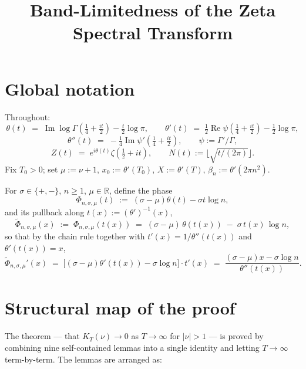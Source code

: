 \documentclass[11pt]{article}
\title{Band-Limitedness of the Zeta Spectral Transform}
\author{}
\date{}
\DeclareMathOperator{\ImOp}{Im}
\DeclareMathOperator{\ReOp}{Re}
\let\Im\ImOp
\let\Re\ReOp
\begin{document}
\maketitle

\section*{Global notation}

Throughout:
\[
\theta(t) \;=\; \Im\log\Gamma\!\left(\tfrac{1}{4}+\tfrac{it}{2}\right) - \tfrac{t}{2}\log\pi,
\qquad
\theta'(t) \;=\; \tfrac{1}{2}\Re\psi\!\left(\tfrac{1}{4}+\tfrac{it}{2}\right) - \tfrac{1}{2}\log\pi,
\]
\[
\theta''(t) \;=\; -\tfrac{1}{4}\Im\psi'\!\left(\tfrac{1}{4}+\tfrac{it}{2}\right),\qquad \psi := \Gamma'/\Gamma,
\]
\[
Z(t) \;=\; e^{i\theta(t)}\zeta(\tfrac{1}{2}+it),\qquad N(t) := \lfloor\sqrt{t/(2\pi)}\rfloor.
\]
Fix $T_{0}>0$; set $\mu := \nu+1$, $x_{0} := \theta'(T_{0})$, $X := \theta'(T)$, $\beta_{n} := \theta'(2\pi n^{2})$.

For $\sigma\in\{+,-\}$, $n\ge 1$, $\mu\in\mathbb{R}$, define the phase
\[
\Phi_{n,\sigma,\mu}(t) \;:=\; (\sigma-\mu)\theta(t) - \sigma t\log n,
\]
and its pullback along $t(x) := (\theta')^{-1}(x)$,
\[
\widetilde\Phi_{n,\sigma,\mu}(x) \;:=\; \Phi_{n,\sigma,\mu}(t(x)) \;=\; (\sigma-\mu)\,\theta(t(x)) \;-\; \sigma\, t(x)\,\log n,
\]
so that by the chain rule together with $t'(x) = 1/\theta''(t(x))$ and $\theta'(t(x)) = x$,
\[
\widetilde\Phi_{n,\sigma,\mu}'(x) \;=\; \bigl[(\sigma-\mu)\theta'(t(x)) - \sigma\log n\bigr]\cdot t'(x) \;=\; \frac{(\sigma-\mu)x - \sigma\log n}{\theta''(t(x))}.
\]

\section*{Structural map of the proof}

The theorem --- that $K_{T}(\nu)\to 0$ as $T\to\infty$ for $|\nu|>1$ --- is proved by combining nine self-contained lemmas into a single identity and letting $T\to\infty$ term-by-term. The lemmas are arranged as:
\end{document}
